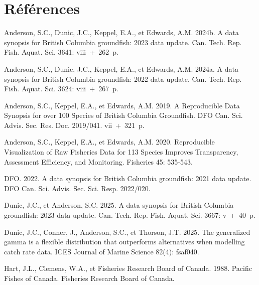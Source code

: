 \documentclass[12pt]{article}\usepackage[]{graphicx}\usepackage[]{color}
\begin{document}
\clearpage

\section{Références}\label{ruxe9fuxe9rences}

\noindent \vspace{-2em} \setlength{\parindent}{-0.2in} \setlength{\leftskip}{0.2in} \setlength{\parskip}{8pt}

\protect{}\label{refs}
\begin{CSLReferences}{1}{0}
Anderson, S.C., Dunic, J.C., Keppel, E.A., et Edwards, A.M. 2024b. A data synopsis for {British Columbia} groundfish: 2023 data update. Can. Tech. Rep. Fish. Aquat. Sci. 3641: viii~+~262~p.

Anderson, S.C., Dunic, J.C., Keppel, E.A., et Edwards, A.M. 2024a. A data synopsis for {British Columbia} groundfish: 2022 data update. Can. Tech. Rep. Fish. Aquat. Sci. 3624: viii~+~267~p.

Anderson, S.C., Keppel, E.A., et Edwards, A.M. 2019. A Reproducible Data Synopsis for over 100 Species of {British Columbia} Groundfish. DFO Can. Sci. Advis. Sec. Res. Doc. 2019/041. vii~+~321~p.

Anderson, S.C., Keppel, E.A., et Edwards, A.M. 2020. Reproducible Visualization of Raw Fisheries Data for 113 Species Improves Transparency, Assessment Efficiency, and Monitoring. Fisheries 45: 535‑543.

DFO. 2022. A data synopsis for {British Columbia} groundfish: 2021 data update. DFO Can. Sci. Advis. Sec. Sci. Resp. 2022/020.

Dunic, J.C., et Anderson, S.C. 2025. A data synopsis for {British Columbia} groundfish: 2023 data update. Can. Tech. Rep. Fish. Aquat. Sci. 3667: v~+~40~p.

Dunic, J.C., Conner, J., Anderson, S.C., et Thorson, J.T. 2025. The generalized gamma is a flexible distribution that outperforms alternatives when modelling catch rate data. ICES Journal of Marine Science 82(4): fsaf040.

Hart, J.L., Clemens, W.A., et Fisheries Research Board of Canada. 1988. Pacific Fishes of {Canada}. {Fisheries Research Board of Canada}.


\end{CSLReferences}
\end{document}
